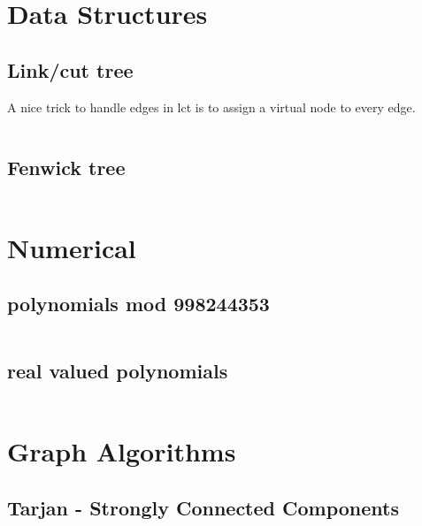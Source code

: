 \documentclass[portrait, 8pt, a4paper, oneside, landscape]{extarticle}
\begin{document}
\thispagestyle{empty}
\begin{figure}[h!]

\end{figure}
\newpage

\twocolumn
\maketitlepage
\newpage

\section{Data Structures}
\subsection{Link/cut tree}
A nice trick to handle edges in lct is to assign a virtual node to every edge.
\inputminted{cpp}{src/lct.cpp}
\subsection{Fenwick tree}
\inputminted{cpp}{src/fenwick2d.cpp}

\section{Numerical}
\subsection{polynomials mod 998244353}
\inputminted{cpp}{src/poly_mod.cpp}

\subsection{real valued polynomials}
\inputminted{cpp}{src/poly.cpp}

\section{Graph Algorithms}

\subsection{Tarjan - Strongly Connected Components}
\inputminted{cpp}{src/scc.cpp}
\end{document}
